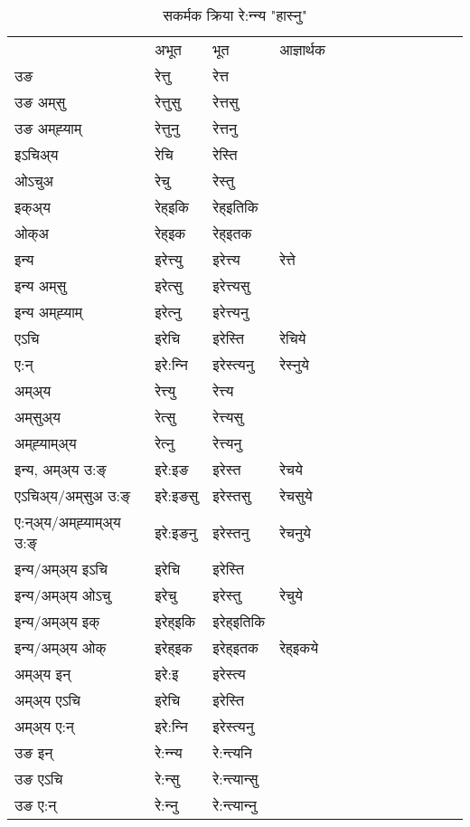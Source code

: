 \begin{table}[H]
\centering
\caption{\label{ett.vt} सकर्मक क्रिया  रे:न्‍न्य  "हास्नु"  }
\begin{tabular}{l|l|l|l|l|l|l|l|l|l|l|l|l}  \toprule
&अभूत & भूत & आज्ञार्थक \\ 
उङ &रेत्तु &रेत्त \\ 
उङ अम्‌सु&रेत्तुसु &रेत्तसु \\ 
उङ अम्‌ह्‍याम्&रेत्तुनु &रेत्तनु \\ 
इऽचिअ्य &रेचि &रेस्ति   \\ 
ओऽचुअ        &रेचु &रेस्तु   \\ 
इक्अ्य&रेह्इकि &रेह्इतिकि   \\ 
ओक्अ &रेह्इक &रेह्इतक   \\ 
इन्य & इरेत्त्यु  & इरेत्त्य &रेत्ते  \\ 
इन्य अम्‌सु& इरेत्सु  & इरेत्त्यसु   \\ 
इन्य अम्‌ह्‍याम्& इरेत्‍नु  & इरेत्त्यनु   \\ 
एऽचि & इरेचि & इरेस्ति &रेचिये    \\ 
ए:न् & इरे:न्‍नि  & इरेस्त्यनु &रेस्‍नुये  \\ 
अम्अ्य & रेत्त्यु  & रेत्त्य  \\ 
अम्‌सुअ्य & रेत्सु & रेत्त्यसु  \\ 
अम्‌ह्‍याम्अ्य & रेत्‍नु  & रेत्त्यनु \\ 
\midrule
इन्य, अम्अ्य उ:ङ्‌ &इरे:इङ &इरेस्त &रेचये \\ 
एऽचिअ्य/अम्‌सुअ उ:ङ्‌ &इरे:इङसु &इरेस्तसु &रेचसुये \\ 
ए:न्अ्य/अम्‌ह्‍याम्अ्य उ:ङ्‌ &इरे:इङनु &इरेस्तनु &रेचनुये \\ 
इन्य/अम्अ्य इऽचि &इरेचि &इरेस्ति    \\ 
इन्य/अम्अ्य ओऽचु &इरेचु &इरेस्तु  &रेचुये  \\ 
इन्य/अम्अ्य इक् &इरेह्इकि &इरेह्इतिकि   \\ 
इन्य/अम्अ्य ओक् &इरेह्इक &इरेह्इतक  &रेह्इकये  \\ 
अम्अ्य इन् & इरे:इ & इरेस्त्य   \\ 
अम्अ्य एऽचि & इरेचि & इरेस्ति    \\ 
अम्अ्य ए:न् & इरे:न्‍नि  & इरेस्त्यनु  \\ 
\midrule
उङ इन् & रे:न्‍न्य  & रे:न्त्यनि  \\ 
उङ एऽचि & रे:न्सु  & रे:न्त्यान्सु   \\ 
उङ ए:न्& रे:न्‍नु  & रे:न्त्यान्‍नु   \\ 
\bottomrule
\end{tabular}
\end{table}


